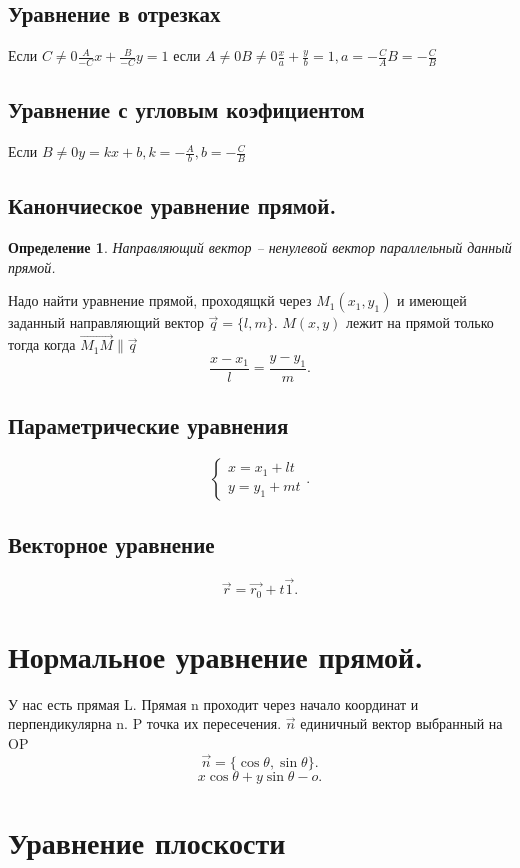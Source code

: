 \documentclass{scrartcl}
\newtheorem{definition}{Определение}
\begin{document}
    \subsection{Уравнение в отрезках}
         Если $C \neq 0 \frac{A}{-C}x + \frac{B}{-C}y = 1$ если $A \neq 0 B\neq 0  \frac{x}{a} + \frac{y}{b} = 1, a = -\frac{C}{A} B = -\frac{C}{B}$ 
    \subsection{Уравнение с угловым коэфициентом}
    Если $B \neq 0 y = kx + b, k = -\frac{A}{b}, b  = -\frac{C}{B}$
    \subsection{Канончиеское уравнение прямой.}
    \begin{definition}
        Направляющий вектор -- ненулевой вектор параллельный данный прямой.
    \end{definition}
    Надо найти уравнение прямой, проходящкй через $M_1(x_1,y_1)$ и имеющей заданный направляющий вектор $\vec{q} = \{l,m\}$. $M(x,y)$ лежит на прямой только тогда когда  $\vec{M_1M} \parallel \vec{q}$
    \[
    \frac{x - x_1}{l} = \frac{y  - y_1}{m}
    .\] 
    \subsection{Параметрические уравнения}
    \[
    \begin{cases}
        x = x_1 + lt\\
        y = y_1 + mt
    \end{cases}
    .\] 
    \subsection{Векторное уравнение}
    \[
    \vec{r} = \vec{r_0} +t \vec{1}
    .\] 
    \section{Нормальное уравнение прямой.}
    У нас есть прямая L. Прямая n проходит через начало координат и перпендикулярна n. 
    P точка их пересечения. $\vec{n}$ единичный вектор выбранный на OP
    \[
        \vec{n} = \{\cos{\theta}, \sin{\theta}\}
    .\] 
    \[
        x \cos{\theta} + y \sin{\theta}  - o
    .\] 
    \section{Уравнение плоскости}
\end{document}
